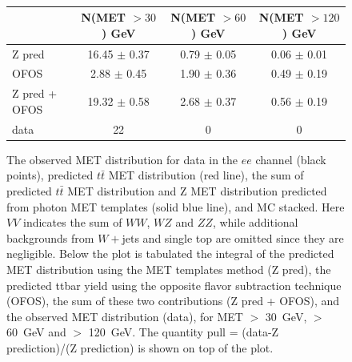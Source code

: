 \begin{figure}[hbtp]
  \begin{center}
	\\ \medskip 
    \begin{tabular}{lccc}
\hline
                        &   N(MET $>30$)  GeV    &   N(MET $>60$)  GeV    &   N(MET $>120$) GeV   \\
\hline
              Z pred    &  16.45  $\pm$  0.37    &   0.79  $\pm$  0.05    &   0.06  $\pm$  0.01   \\
                OFOS    &   2.88  $\pm$  0.45    &   1.90  $\pm$  0.36    &   0.49  $\pm$  0.19   \\
\hline
       Z pred + OFOS    &  19.32  $\pm$  0.58    &   2.68  $\pm$  0.37    &   0.56  $\pm$  0.19   \\
\hline
                data    &                  22    &                   0    &                   0   \\
\hline
    \end{tabular}
    \caption{
      The observed MET distribution for data in the $ee$ channel (black points),
      predicted $t\bar{t}$ MET distribution (red line), the sum of predicted $t\bar{t}$ MET distribution and
      Z  MET  distribution  predicted  from photon  MET  templates
      (solid blue line),  and MC stacked. Here $VV$  indicates the sum
      of  $WW$,  $WZ$  and  $ZZ$, while  additional  backgrounds  from
      $W+$jets   and   single  top   are   omitted   since  they   are
      negligible.  Below the  plot is  tabulated the  integral  of the
      predicted  MET distribution  using the  MET templates  method (Z
      pred),  the  predicted ttbar  yield  using  the opposite  flavor
      subtraction  technique (OFOS), the  sum of  these two
      contributions (Z pred + OFOS), and the observed MET distribution
      (data), for  MET $>$ 30~GeV,  $>$ 60~GeV and $>$  120~GeV. The
      quantity pull  = (data-Z prediction)/(Z prediction)  is shown on
      top  of the  plot.  
    }
    \label{fig:pfmet_ee}
  \end{center}
\end{figure}

